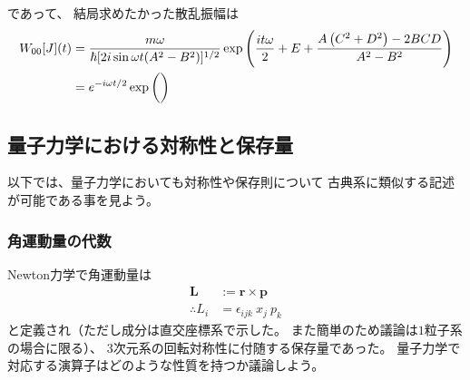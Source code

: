 であって、
結局求めたかった散乱振幅は
\begin{align}
    W_{00}[J](t)
    &=
    \dfrac{m \omega}{
        \hbar
        [
            2 i \sin \omega t 
            (A^2 - B^2)
        ]^{1 / 2}
    }
    \exp\left(
        \dfrac{i t \omega}{2}
        +
        E
        +
        \dfrac{
            A
            \left(
                C^2 + D^2
            \right)
        -
            2 BCD
        }{
            A^2 - B^2
        }
    \right)
\notag\\&
    =
    e^{ - i \omega t / 2 }
    \exp\bigg(
    \bigg)
\end{align}

\subsection{量子力学における対称性と保存量}

以下では、量子力学においても対称性や保存則について
古典系に類似する記述が可能である事を見よう。

\subsubsection{角運動量の代数}
\label{subsubsec: angular momentum}

Newton力学で角運動量は
\begin{subequations}
\begin{align}
    \bm{L} &:= \bm{r} \times \bm{p}
    \\\therefore
    L_i &= \epsilon_{ijk} \ x_j \ p_k
\end{align}
\end{subequations}
と定義され（ただし成分は直交座標系で示した。
また簡単のため議論は$1$粒子系の場合に限る）、
3次元系の回転対称性に付随する保存量であった。
量子力学で対応する演算子はどのような性質を持つか議論しよう。

